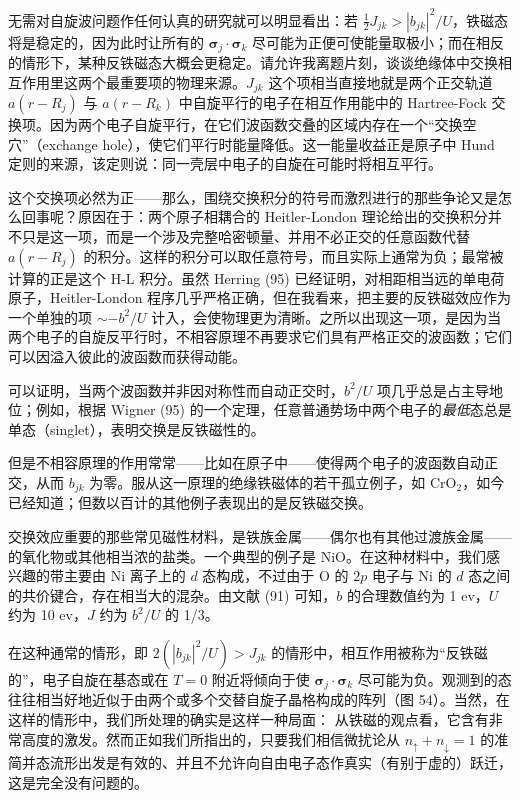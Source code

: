 无需对自旋波问题作任何认真的研究就可以明显看出：若 $\frac{1}{2}J_{jk} > |b_{jk}|^{2}/U$，铁磁态将是稳定的，因为此时让所有的 $\boldsymbol{\sigma}_j\cdot\boldsymbol{\sigma}_k$ 尽可能为正便可使能量取极小；而在相反的情形下，某种反铁磁态大概会更稳定。请允许我离题片刻，谈谈绝缘体中交换相互作用里这两个最重要项的物理来源。$J_{jk}$ 这个项相当直接地就是两个正交轨道 $a(r-R_j)$ 与 $a(r-R_k)$ 中自旋平行的电子在相互作用能中的 Hartree-Fock 交换项。因为两个电子自旋平行，在它们波函数交叠的区域内存在一个“交换空穴”（exchange hole），使它们平行时能量降低。这一能量收益正是原子中 Hund 定则的来源，该定则说：同一壳层中电子的自旋在可能时将相互平行。

这个交换项必然为正——那么，围绕交换积分的符号而激烈进行的那些争论又是怎么回事呢？原因在于：两个原子相耦合的 Heitler-London 理论给出的交换积分并不只是这一项，而是一个涉及完整哈密顿量、并用不必正交的任意函数代替 $a(r-R_j)$ 的积分。这样的积分可以取任意符号，而且实际上通常为负；最常被计算的正是这个 H-L 积分。虽然 Herring (95) 已经证明，对相距相当远的单电荷原子，Heitler-London 程序几乎严格正确，但在我看来，把主要的反铁磁效应作为一个单独的项 $\sim -b^{2}/U$ 计入，会使物理更为清晰。之所以出现这一项，是因为当两个电子的自旋反平行时，不相容原理不再要求它们具有严格正交的波函数；它们可以因溢入彼此的波函数而获得动能。

可以证明，当两个波函数并非因对称性而自动正交时，$b^{2}/U$ 项几乎总是占主导地位；例如，根据 Wigner (95) 的一个定理，任意普通势场中两个电子的\emph{最低}态总是单态（singlet），表明交换是反铁磁性的。

但是不相容原理的作用常常——比如在原子中——使得两个电子的波函数自动正交，从而 $b_{jk}$ 为零。服从这一原理的绝缘铁磁体的若干孤立例子，如 $\mathrm{CrO_2}$，如今已经知道；但数以百计的其他例子表现出的是反铁磁交换。

交换效应重要的那些常见磁性材料，是铁族金属——偶尔也有其他过渡族金属——的氧化物或其他相当浓的盐类。一个典型的例子是 $\mathrm{NiO}$。在这种材料中，我们感兴趣的带主要由 Ni 离子上的 $d$ 态构成，不过由于 O 的 $2p$ 电子与 Ni 的 $d$ 态之间的共价键合，存在相当大的混杂。由文献 (91) 可知，$b$ 的合理数值约为 1 ev，$U$ 约为 10 ev，$J$ 约为 $b^{2}/U$ 的 1/3。

在这种通常的情形，即 $2(|b_{jk}|^{2}/U) > J_{jk}$ 的情形中，相互作用被称为“反铁磁的”，电子自旋在基态或在 $T=0$ 附近将倾向于使 $\boldsymbol{\sigma}_j\cdot\boldsymbol{\sigma}_k$ 尽可能为负。观测到的态往往相当好地近似于由两个或多个交替自旋子晶格构成的阵列（图 54）。当然，在这样的情形中，我们所处理的确实是这样一种局面：
从铁磁的观点看，它含有非常高度的激发。然而正如我们所指出的，只要我们相信微扰论从 $n_\uparrow + n_\downarrow = 1$ 的准简并态流形出发是有效的、并且不允许向自由电子态作真实（有别于虚的）跃迁，这是完全没有问题的。

